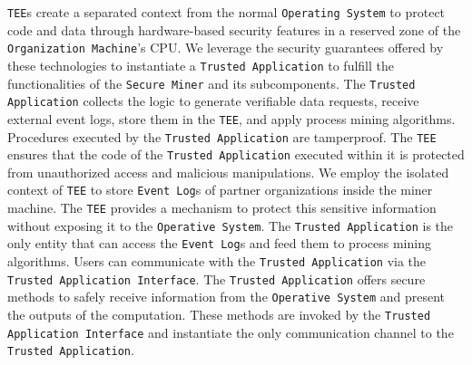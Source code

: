 \texttt{TEE}s create a separated context from the normal \texttt{Operating System} to protect code and data through hardware-based security features in a reserved zone of the \texttt{Organization Machine}'s CPU. We leverage the security guarantees offered by these technologies to instantiate a \texttt{Trusted Application} to fulfill the functionalities of the \texttt{Secure Miner} and its subcomponents. The \texttt{Trusted Application} collects the logic to generate verifiable data requests, receive external event logs, store them in the \texttt{TEE}, and apply process mining algorithms. Procedures executed by the \texttt{Trusted Application} are tamperproof. The \texttt{TEE} ensures that the code of the \texttt{Trusted Application} executed within it is protected from unauthorized access and malicious manipulations. We employ the isolated context of \texttt{TEE} to store \texttt{Event Log}s of partner organizations inside the miner machine. The \texttt{TEE} provides a mechanism to protect this sensitive information without exposing it to the \texttt{Operative System}. The \texttt{Trusted Application} is the only entity that can access the \texttt{Event Log}s and feed them to process mining algorithms. Users can communicate with the \texttt{Trusted Application} via the \texttt{Trusted Application Interface}. The \texttt{Trusted Application} offers secure methods to safely receive information from the \texttt{Operative System} and present the outputs of the computation. These methods are invoked by the \texttt{Trusted Application Interface} and instantiate the only communication channel to the \texttt{Trusted Application}.

